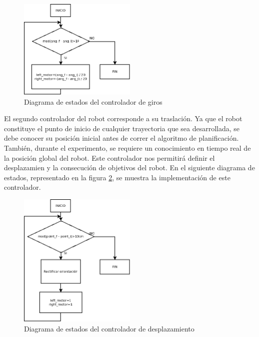 \begin{figure}[H]
		\centering
        \includegraphics[width=0.5\textwidth]{images/flujogiro.png}
        \caption{Diagrama de estados del controlador de giros}
        \label{fig:flujogiro}
\end{figure} 

El segundo controlador del robot corresponde a su traslación. Ya que el robot constituye el punto de inicio de cualquier trayectoria que sea desarrollada, se debe conocer su posición inicial antes de correr el algoritmo de planificación. También, durante el experimento, se requiere un conocimiento en tiempo real de la posición global del robot. Este controlador nos permitirá definir el desplazamien y la consecución de objetivos del robot. En el siguiente diagrama de estados, representado en la figura \ref{fig:flujoavance}, se muestra la implementación de este controlador.

\begin{figure}[H]
		\centering
        \includegraphics[width=0.5\textwidth]{images/flujoavance.png}
        \caption{Diagrama de estados del controlador de desplazamiento}
        \label{fig:flujoavance}
\end{figure} 